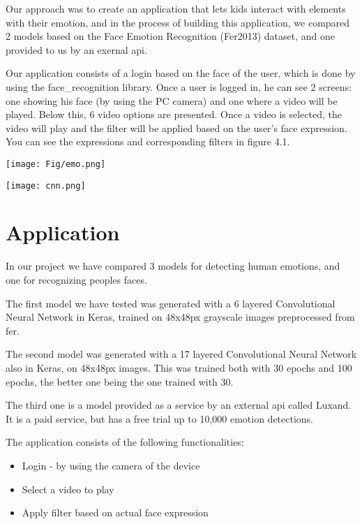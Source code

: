 \documentclass[runningheads,a4paper,11pt]{report}
\begin{document}
Our approach was to create an application that lets kids interact with elements with their emotion, and in the process of building this application, we compared 2 models based on the Face Emotion Recognition (Fer2013) dataset, and one provided to us by an exernal \gls{api}.

Our application consists of a login based on the face of the user, which is done by using the face\_recognition library. Once a user is logged in, he can see 2 screens: one showing his face (by using the PC camera) and one where a video will be played. Below this, 6 video options are presented. Once a video is selected, the video will play and the filter will be applied based on the user's face expression. You can see the expressions and corresponding filters in figure 4.1.

\begin{center}
    \texttt{[image: Fig/emo.png]}
\end{center}

\begin{center}
    \texttt{[image: cnn.png]}
\end{center}

\chapter{Application}
\label{chapter:application}

In our project we have compared 3 models for detecting human emotions, and one for recognizing peoples faces.

The first model we have tested was generated with a 6 layered Convolutional Neural Network in Keras, trained on 48x48px grayscale images preprocessed from \gls{fer}.

The second model was generated with a 17 layered Convolutional Neural Network also in Keras, on 48x48px images. This was trained both with 30 epochs and 100 epochs, the better one being the one trained with 30.

The third one is a model provided as a service by an external \gls{api} called Luxand. It is a paid service, but has a free trial up to 10,000 emotion detections.

\vspace{10mm}
The application consists of the following functionalities:

\begin{itemize}
    \item Login - by using the camera of the device
    \item Select a video to play
    \item Apply filter based on actual face expression
\end{itemize}
\end{document}
